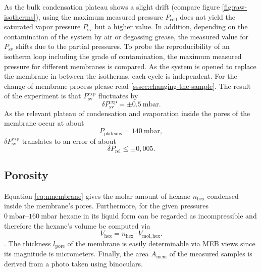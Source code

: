 \documentclass[../thesis.tex]{subfiles}
\begin{document}
            As the bulk condensation plateau shows a slight drift (compare figure \cref{fig:raw-isotherms}), using the maximum measured pressure $P_\mathrm{cell}$ does not yield the saturated vapor pressure $P_\mathrm{sv}$ but a higher value. In addition, depending on the contamination of the system by air or degassing grease, the measured value for $P_\mathrm{sv}$ shifts due to the partial pressures. To probe the reproducibility of an isotherm loop including the grade of contamination, the maximum measured pressure for different membranes is compared. As the system is opened to replace the membrane in between the isotherms, each cycle is independent. For the change of membrane process please read \cref{sssec:changing-the-sample}. The result of the experiment is that $P_\mathrm{sv}^\mathrm{exp}$ fluctuates by
            \begin{equation}
                \delta P_\mathrm{sv}^\mathrm{exp} = \pm \SI{0,5}{\milli\bar}.
                \label{eq:delta-Psat}
            \end{equation}
            As the relevant plateau of condensation and evaporation inside the pores of the membrane occur at about
            \begin{equation}
                P_\mathrm{plateaus} = \SI{140}{\milli\bar},
            \end{equation}
            $\delta P_\mathrm{sv}^\mathrm{exp}$ translates to an error of about
            \begin{equation}
                \delta P_\mathrm{rel} \le \pm 0,005.
                \label{eq:delta-Prel}
            \end{equation}


        \subsection{Porosity}
        \label{subsec:porosity}

            Equation \cref{eq:nmembrane} gives the molar amount of hexane $n_\mathrm{hex}$ condensed inside the membrane's pores. Furthermore, for the given pressures $\SIrange{0}{160}{\milli\bar}$ hexane in its liquid form can be regarded as incompressible and therefore the hexane's volume be computed via
            \begin{equation*}
                V_\mathrm{hex} = n_\mathrm{hex} \cdot V_\mathrm{mol, hex}.
            \end{equation*}.
            The thickness $l_\mathrm{pore}$ of the membrane is easily determinable via MEB views since its magnitude is micrometers. Finally, the area $A_\mathrm{mem}$ of the measured samples is derived from a photo taken using binoculars.
\end{document}
